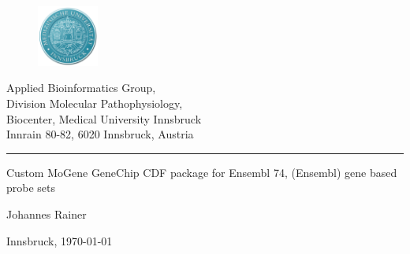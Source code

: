 \documentclass[a4paper,10pt,american]{report}
\begin{document}
\begin{titlepage}

 \begin{center}
   \parbox[t]{9cm}{
     \begin{figure}
        \includegraphics[width=2cm]{./images/MUIlogo-2.png}
      \end{figure}
      \parbox[t]{7.8cm}{
      \vspace{0.4cm}
      \raggedright
      \normalsize
      Applied Bioinformatics Group,\\
      Division Molecular Pathophysiology,\\
      Biocenter, Medical University Innsbruck\\
      Innrain 80-82, 6020 Innsbruck, Austria\\
      \noindent\rule[1ex]{\linewidth}{1pt}
      }
    }
  \end{center}
\vspace{6.5cm}
    \begin{center}
     \Large
     Custom MoGene GeneChip CDF package for Ensembl 74, (Ensembl) gene based
     probe sets
    \end{center}

\vspace{1.5cm}

    \begin{center}
     \large
     Johannes Rainer
    \end{center}

\vspace{7.5cm}
   \vfill
   \begin{center}
     \normalsize
     Innsbruck, \today \\
   \end{center}
\end{titlepage}



\pagebreak

  \pagebreak

  \setcounter{secnumdepth}{0}

  \setcounter{secnumdepth}{3}

  \setcounter{page}{1}


\end{document}
